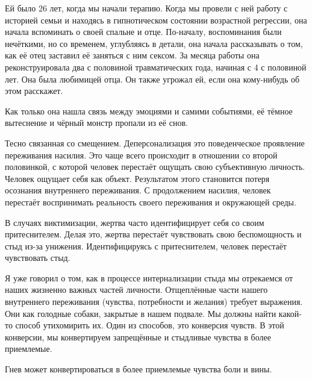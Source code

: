 \documentclass[10pt, fleqn]{article}
\begin{document}
Ей было 26 лет, когда мы начали терапию. Когда мы провели с ней работу с историей семьи и находясь в гипнотическом состоянии возрастной регрессии, она начала вспоминать о своей спальне и отце. По-началу, воспоминания были нечёткими, но со временем, углубляясь в детали, она начала рассказывать о том, как её отец заставил её заняться с ним сексом. За месяца работы она реконструировала два с половиной травматических года, начиная с 4 с половиной лет. Она была любимицей отца. Он также угрожал ей, если она кому-нибудь об этом расскажет.

Как только она нашла связь между эмоциями и самими событиями, её тёмное вытеснение и чёрный монстр пропали из её снов.


Тесно связанная со смещением.
Деперсонализация это поведенческое проявление переживания насилия. Это чаще всего происходит в отношении со второй половинкой, с которой человек перестаёт ощущать свою субъективную личность. Человек ощущает себя как объект. Результатом этого становится потеря осознания внутреннего переживания. С продолжением насилия, человек перестаёт воспринимать реальность своего переживания и окружающей среды.


В случаях виктимизации, жертва часто идентифицирует себя со своим притеснителем. Делая это, жертва перестаёт чувствовать свою беспомощность и стыд из-за унижения. Идентифицируясь с притеснителем, человек перестаёт чувствовать стыд.



Я уже говорил о том, как в процессе интернализации стыда мы отрекаемся от наших жизненно важных частей личности. Отщеплённые части нашего внутреннего переживания (чувства, потребности и желания) требует выражения. Они как голодные собаки, закрытые в нашем подвале. Мы должны найти какой-то способ утихомирить их. Один из способов, это конверсия чувств. В этой конверсии, мы конвертируем запрещённые и стыдливые чувства в более приемлемые.

Гнев может конвертироваться в более приемлемые чувства боли и вины.
\end{document}
